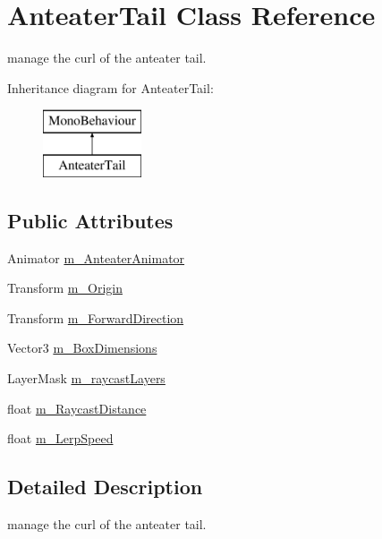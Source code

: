 \hypertarget{class_anteater_tail}{}\section{Anteater\+Tail Class Reference}
\label{class_anteater_tail}


manage the curl of the anteater tail.  


Inheritance diagram for Anteater\+Tail\+:\begin{figure}[H]
\begin{center}
\leavevmode
\includegraphics[height=2.000000cm]{class_anteater_tail}
\end{center}
\end{figure}
\subsection*{Public Attributes}
\begin{DoxyCompactItemize}
\item 
Animator \mbox{\hyperlink{class_anteater_tail_a292283f9bb2a2d0bd83f51d175a8c3b9}{m\+\_\+\+Anteater\+Animator}}
\item 
Transform \mbox{\hyperlink{class_anteater_tail_a6dac749c9b6972c41f92c4de33d7a41c}{m\+\_\+\+Origin}}
\item 
Transform \mbox{\hyperlink{class_anteater_tail_a1c1d2a03dc1d9ce96df9c5ff53cb5751}{m\+\_\+\+Forward\+Direction}}
\item 
Vector3 \mbox{\hyperlink{class_anteater_tail_ad000272f6194015daf35ae3ab1576fbf}{m\+\_\+\+Box\+Dimensions}}
\item 
Layer\+Mask \mbox{\hyperlink{class_anteater_tail_a2b8669ab7a157eedf5edc3ea62258399}{m\+\_\+raycast\+Layers}}
\item 
float \mbox{\hyperlink{class_anteater_tail_aee47b4a69dae00ac629c058c59cb994e}{m\+\_\+\+Raycast\+Distance}}
\item 
float \mbox{\hyperlink{class_anteater_tail_ab17f4e3855c4878a67d6edf70beab835}{m\+\_\+\+Lerp\+Speed}}
\end{DoxyCompactItemize}


\subsection{Detailed Description}
manage the curl of the anteater tail. 




